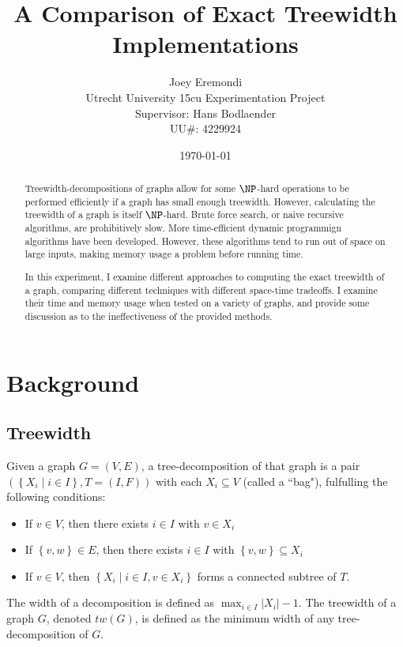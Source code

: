 \documentclass{article}
\title{A Comparison of Exact Treewidth Implementations}
\author{Joey Eremondi\\
Utrecht University 15cu Experimentation Project\\
Supervisor: Hans Bodlaender\\
UU\#: 4229924}
\date{\today}
\newcommand\abs[1]{\left|#1\right|}
\newcommand\set[1]{\left\{#1\right\}}
\newcommand\sst[0]{\mid}
\begin{document}
\maketitle

\begin{abstract}
Treewidth-decompositions of graphs allow for some $\NP$-hard operations to be performed
efficiently if a graph has small enough treewidth.
However, calculating the treewidth of a graph is itself $\NP$-hard.
Brute force search, or naive recursive algorithms, are prohibitively slow.
More time-efficient dynamic programmign algorithms have been developed.
However, these algorithms tend to run out of space on large inputs, making memory usage
a problem before running time.

In this experiment, I examine different approaches to computing the exact treewidth of a graph,
comparing different techniques with different space-time tradeoffs. I examine their time and memory
usage when tested on a variety of graphs, and provide some discussion as to the ineffectiveness
of the provided methods.
\end{abstract}



\section{Background}

\subsection{Treewidth}

Given a graph $G=(V,E)$, a tree-decomposition of that graph is a pair $(\set{X_i \sst i \in I}, T=(I, F)  )$ 
with each $X_i \subseteq V$ (called a ``bag"), fulfulling the following conditions:
\begin{itemize}
\item If $v \in V$, then there exists $i \in I$ with $v \in X_i$
\item If $\set{v,w} \in E$, then there exists $i \in I$ with $\set{v,w} \subseteq X_i$
\item If $v \in V$, then $\set{X_i \sst i \in I, v \in X_i}$ forms a connected subtree of $T$.
\end{itemize}

The width of a decomposition is defined as $\max_{i \in I}\abs{X_i} - 1$. The treewidth of a graph $G$,
denoted $tw(G)$,
is defined as the minimum width of any tree-decomposition of $G$.
\end{document}
